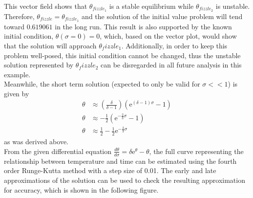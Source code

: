 \documentclass{article}
\begin{document}
This vector field shows that $\theta_{fizzle_1}$ is a stable equilibrium while $\theta_{fizzle_2}$ is unstable.  Therefore, $\theta_{fizzle} = \theta_{fizzle_1}$ and the solution of the initial value problem will tend toward $0.619061$ in the long run. This result is also supported by the known initial condition, $\theta(\sigma = 0) = 0$, which, based on the vector plot, would show that the solution will approach $\theta_fizzle_1$. Additionally, in order to keep this problem well-posed, this initial condition cannot be changed, thus the unstable solution represented by $\theta_fizzle_2$ can be disregarded in all future analysis in this example. \\

\noindent Meanwhile, the short term solution (expected to only be valid for $\sigma << 1$) is given by 
\begin{align*}
    \theta &\approx (\frac{\delta}{\delta - 1})(\text{e}^{(\delta - 1)\sigma} - 1) \\
    \theta &\approx -\frac{1}{2}(\text{e}^{-\frac{2}{3}\sigma} -1) \\
    \theta &\approx \frac{1}{2} - \frac{1}{2}\text{e}^{-\frac{2}{3}\sigma}
\end{align*}
as was derived above.\\
\noindent From the given differential equation $\frac{d\theta}{d\sigma} = \delta \text{e}^\theta - \theta$, the full curve representing the relationship between temperature and time can be estimated using the fourth order Runge-Kutta method with a step size of 0.01. The early and late approximations of the solution can be used to check the resulting approximation for accuracy, which is shown in the following figure. 
 
\end{document}
